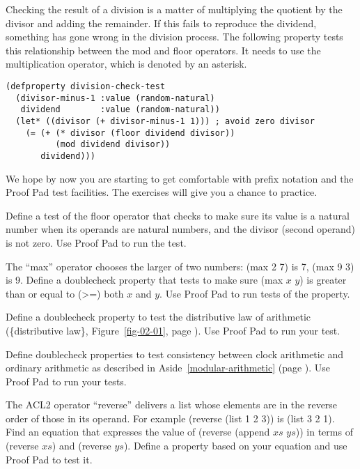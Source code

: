 Checking the result of a division is a matter
of multiplying the quotient by the divisor and adding the remainder.
If this fails to reproduce the dividend,
something has gone wrong in the division process.
The following property tests this relationship
between the mod and floor operators.
It needs to use the multiplication operator, which is denoted by an asterisk.

\label{division-check-test}
\begin{Verbatim}
(defproperty division-check-test
  (divisor-minus-1 :value (random-natural)
   dividend        :value (random-natural))
  (let* ((divisor (+ divisor-minus-1 1))) ; avoid zero divisor
    (= (+ (* divisor (floor dividend divisor))
          (mod dividend divisor))
       dividend)))
\end{Verbatim}

We hope by now you are starting to get comfortable with prefix notation
and the Proof Pad test facilities.
The exercises will give you a chance to practice.

\begin{ExerciseList}
\Exercise Define a test of the floor operator
that checks to make sure its value is a natural number
when its operands are natural numbers,
and the divisor (second operand) is not zero.
Use Proof Pad to run the test.

\Exercise The ``max'' operator chooses the larger of two numbers:
(max 2 7) is 7, (max 9 3) is 9.
Define a doublecheck property that tests to make sure
(max $x$ $y$) is
greater
than or equal to (>=) both $x$ and $y$.
Use Proof Pad to run tests of the property.

\Exercise
Define a doublecheck property to test the distributive law
of arithmetic (\{distributive law\}, Figure~\ref{fig-02-01}, page \pageref{fig-02-01}).
Use Proof Pad to run your test.

\Exercise
Define doublecheck properties to test
consistency between clock
arithmetic and ordinary arithmetic
as described in
Aside~\ref{modular-arithmetic} (page \pageref{modular-arithmetic}).
Use Proof Pad to run your tests.

\Exercise
The ACL2 operator ``reverse''
delivers a list whose elements are in the reverse order of those in its operand.
For example (reverse (list 1 2 3)) is (list 3 2 1).
Find an equation that expresses the value of (reverse (append $xs$ $ys$))
in terms of (reverse $xs$) and (reverse $ys$).
Define a property based on your equation and
use Proof Pad to test it.

\end{ExerciseList}

